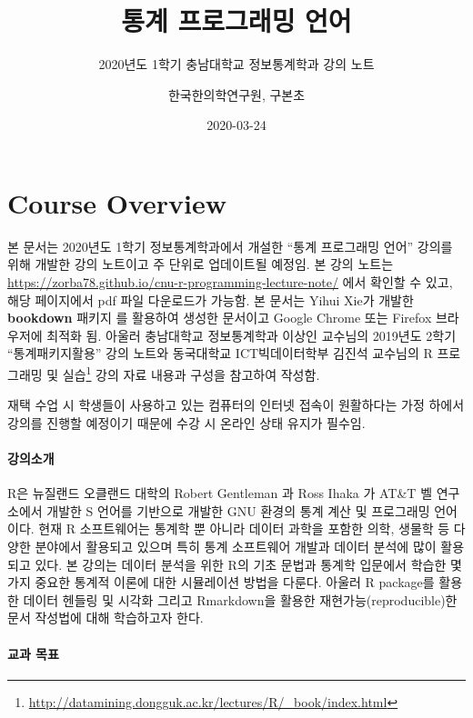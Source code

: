 \documentclass[
  11pt,
]{krantz}
\title{통계 프로그래밍 언어}
\subtitle{2020년도 1학기 충남대학교 정보통계학과 강의 노트}
\author{한국한의학연구원, 구본초}
\date{2020-03-24}
\renewcommand{\href}[2]{#2\footnote{\url{#1}}}
\let\BeginKnitrBlock\begin \let\EndKnitrBlock\end
\begin{document}
\maketitle

{
\hypersetup{linkcolor=}
\setcounter{tocdepth}{2}
\tableofcontents
}
\listoftables
\listoffigures
\hypertarget{overview}{%
\chapter*{Course Overview}\label{overview}}


\BeginKnitrBlock{rmdnote}
본 문서는 2020년도 1학기 정보통계학과에서 개설한 ``통계 프로그래밍 언어'' 강의를 위해 개발한 강의 노트이고 주 단위로 업데이트될 예정임. 본 강의 노트는 \url{https://zorba78.github.io/cnu-r-programming-lecture-note/} 에서 확인할 수 있고, 해당 페이지에서 pdf 파일 다운로드가 가능함. 본 문서는 Yihui Xie가 개발한 \textbf{bookdown} 패키지 \citep{xie-2016}를 활용하여 생성한 문서이고 Google Chrome 또는 Firefox 브라우저에 최적화 됨. 아울러 충남대학교 정보통계학과 이상인 교수님의 2019년도 2학기 ``통계패키지활용'' 강의 노트와 동국대학교 ICT빅데이터학부 김진석 교수님의 \href{http://datamining.dongguk.ac.kr/lectures/R/_book/index.html}{R 프로그래밍 및 실습} 강의 자료 내용과 구성을 참고하여 작성함.

재택 수업 시 학생들이 사용하고 있는 컴퓨터의 인터넷 접속이 원활하다는 가정 하에서 강의를 진행할 예정이기 때문에 수강 시 온라인 상태 유지가 필수임.
\EndKnitrBlock{rmdnote}

\hypertarget{intro-lec}{%
\subsubsection*{강의소개}\label{intro-lec}}


R은 뉴질랜드 오클랜드 대학의 Robert Gentleman 과 Ross Ihaka 가 AT\&T 벨 연구소에서 개발한 S 언어를 기반으로 개발한 GNU 환경의 통계 계산 및 프로그래밍 언어이다. 현재 R 소프트웨어는 통계학 뿐 아니라 데이터 과학을 포함한 의학, 생물학 등 다양한 분야에서 활용되고 있으며 특히 통계 소프트웨어 개발과 데이터 분석에 많이 활용되고 있다. 본 강의는 데이터 분석을 위한 R의 기초 문법과 통계학 입문에서 학습한 몇 가지 중요한 통계적 이론에 대한 시뮬레이션 방법을 다룬다. 아울러 R package를 활용한 데이터 헨들링 및 시각화 그리고 Rmarkdown을 활용한 재현가능(reproducible)한 문서 작성법에 대해 학습하고자 한다.

\hypertarget{purpose-course}{%
\subsubsection*{교과 목표}\label{purpose-course}}
\end{document}
